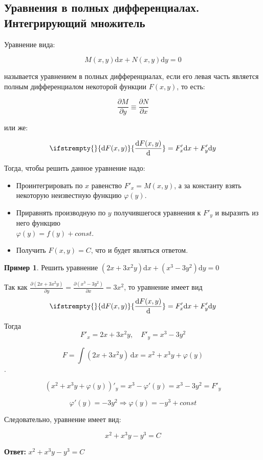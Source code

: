\documentclass[a4paper, 14pt]{article}
\newcommand{\dx}{\mathrm{d}x}
\newcommand{\dy}{\mathrm{d}y}
\newcommand{\dv}[2]{%
  \ifstrempty{#2}%
    {\mathrm{d}#1}%
    {\frac{\mathrm{d}#1}{\mathrm{d}#2}}%
}
\newcommand{\pdv}[2]{\frac{\partial #1}{\partial #2}}
\renewcommand{\phi}{\varphi}
\theoremstyle{definition}
\newtheorem*{example}{Пример}
\newenvironment{answer}
  {\par\noindent\textbf{Ответ:}}
  {\par}
\begin{document}
\subsection{Уравнения в полных дифференциалах. Интегрирующий множитель}

Уравнение вида:

\[M(x, y)\dx + N(x, y)\dy = 0\]

называется уравнением в полных дифференциалах, если его левая часть является полным дифференциалом некоторой функции $F(x, y)$, то есть:

\[\pdv{M}{y} \equiv \pdv{N}{x}\]

или же:

\[\dv{F(x, y)}{} = F'_x\dx + F'_y\dy\]

Тогда, чтобы решить данное уравнение надо:

\begin{itemize}
    \item\textbf{}Проинтегрировать по $x$ равенство $F'_x = M(x, y)$, а за константу взять некоторую неизвестную функцию $\phi{(y)}$.
    \item\textbf{}Приравнять производную по $y$ получившегося уравнения к $F'_y$ и выразить из него функцию \\$\phi(y) = f(y) + const$.
    \item\textbf{}Получить $F(x, y) = C$, что и будет являться ответом.
\end{itemize}
\begin{example}
    Решить уравнение $(2x+3x^2y)\dx+(x^3-3y^2)\dy = 0$
    
\medskip

    Так как $\pdv{(2x+3x^2y)}{y} = \pdv{(x^3-3y^2)}{x} = 3x^2$, то уравнение имеет вид 
    \[\dv{F(x, y)}{} = F'_x\dx + F'_y\dy\]

    Тогда 
    \[F'_x = 2x+3x^2y, \quad F'_y = x^3-3y^2\]

    \[F=\int{(2x+3x^2y)}\, \dx = x^2 + x^3y +\phi{(y)}\].

    \[(x^2 + x^3y +\phi{(y)})'_y = x^3-\phi'{(y)} = x^3 - 3y^2 = F'_y\]

    \[\phi'{(y)} =- 3y^2 \Longrightarrow \phi{(y)} =-y^3 +const \]

    Следовательно, уравнение имеет вид:

    \[x^2+x^3y - y^3 = C\]
\end{example}
\begin{answer}
    $x^2+x^3y - y^3 = C$
\end{answer}
\bigskip
\end{document}
